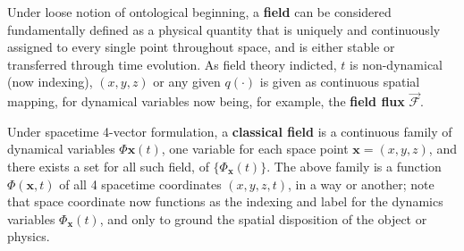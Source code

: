 \documentclass[10pt]{article}
\begin{document}
Under loose notion of ontological beginning, a \textbf{field} can be considered fundamentally defined as a physical quantity that is uniquely and continuously assigned to every single point throughout space, and is either stable or transferred through time evolution. As field theory indicted, $t$ is non-dynamical (now indexing), $(x,y,z)$ or any given $q(\cdot)$ is given as continuous spatial mapping,  for dynamical variables now being, for example, the \textbf{field flux} $\mathcal{\vec{F}}$. 

Under spacetime 4-vector formulation, a \textbf{classical field} is a continuous family of dynamical variables $\Phi{\mathbf{x}}(t)$, one variable for each space point $\mathbf{x}=(x,y,z)$, and there exists a set for all such field, of $\{\Phi_{\mathbf{x}}(t)\}$. The above family is a function $\Phi(\mathbf{x},t)$ of all 4 spacetime coordinates $(x,y,z,t)$, in a way or another; note that space coordinate now functions as the indexing and label for the dynamics variables $\Phi_{\mathbf{x}}(t)$, and only to ground the spatial disposition of the object or physics. 
\end{document}
